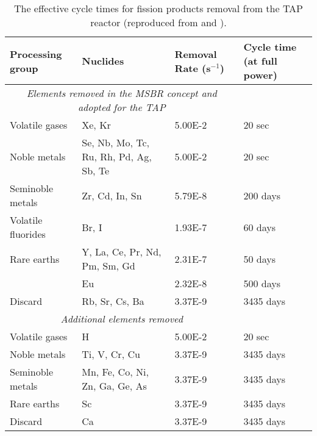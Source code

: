 \begin{table}[htp!]
	\centering
	\caption{The effective cycle times for fission products removal  from the 
		\gls{TAP} reactor (reproduced from \cite{betzler_implementation_2017} 
		and 
		\cite{transatomic_power_corporation_neutronics_2016}).}
	\begin{tabular}{p{} p{} p{} 
			p{}}
		\hline 
		\textbf{Processing group} & \qquad\qquad\qquad \textbf{Nuclides} & 
		\textbf{Removal Rate (s$^{-1}$)} & \textbf{Cycle time (at full power)} 
		\\ [5pt] \hline 
		\multicolumn{3}{c}{\textit{Elements removed in the \gls{MSBR} concept 
		and adopted for the \gls{TAP}} \cite{robertson_conceptual_1971}} \\
		Volatile gases & Xe, Kr								  & 5.00E-2 & 20 
		sec \\ [5pt]
		Noble metals & Se, Nb, Mo, Tc, Ru, Rh, Pd, Ag, Sb, Te & 5.00E-2 & 20 
		sec \\ [5pt]
		Seminoble metals & Zr, Cd, In, Sn	  				  & 5.79E-8 & 200 
		days \\ [5pt]
		Volatile fluorides & Br, I 							  & 1.93E-7 & 60 
		days \\ [5pt]
		Rare earths & Y, La, Ce, Pr, Nd, Pm, Sm, Gd           & 2.31E-7 & 50 
		days \\ [5pt]
		\qquad & Eu & 2.32E-8 & 500 days \\ [5pt]
		Discard & Rb, Sr, Cs, Ba & 3.37E-9 & 3435 days \\ [5pt] 
		\hline
		
		\multicolumn{3}{c}{\textit{Additional elements removed} 
			\cite{transatomic_power_corporation_neutronics_2016, 
				betzler_implementation_2017}  } \\
		Volatile gases & H								  	& 5.00E-2 & 20 
		sec    \\ [5pt]
		Noble metals & Ti, V, Cr, Cu						& 3.37E-9 & 3435 
		days \\ [5pt]
		Seminoble metals & Mn, Fe, Co, Ni, Zn, Ga, Ge, As   & 3.37E-9 & 3435 
		days \\ [5pt]
		Rare earths & Sc									& 3.37E-9 & 3435 
		days \\ [5pt]
		Discard & Ca										& 3.37E-9 & 3435 
		days \\ [5pt] 
		\hline
	\end{tabular}
	\label{tab:reprocessing_list}
	\vspace{-0.9em}
\end{table}


